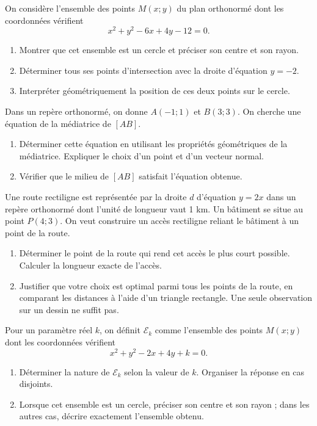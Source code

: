On considère l’ensemble des points $M(x;y)$ du plan orthonormé dont les coordonnées vérifient\[x^2+y^2-6x+4y-12=0.\]
\begin{enumerate}[label=\arabic*.]
\item Montrer que cet ensemble est un cercle et préciser son centre et son rayon.
\item Déterminer tous ses points d’intersection avec la droite d’équation $y=-2$.
\item Interpréter géométriquement la position de ces deux points sur le cercle.
\end{enumerate}
Dans un repère orthonormé, on donne $A(-1;1)$ et $B(3;3)$. On cherche une équation de la médiatrice de $[AB]$.
\begin{enumerate}[label=\arabic*.]
\item Déterminer cette équation en utilisant les propriétés géométriques de la médiatrice. Expliquer le choix d’un point et d’un vecteur normal.
\item Vérifier que le milieu de $[AB]$ satisfait l’équation obtenue.
\end{enumerate}
Une route rectiligne est représentée par la droite $d$ d’équation $y=2x$ dans un repère orthonormé dont l’unité de longueur vaut 1 km. Un bâtiment se situe au point $P(4;3)$. On veut construire un accès rectiligne reliant le bâtiment à un point de la route.
\begin{enumerate}[label=\arabic*.]
\item Déterminer le point de la route qui rend cet accès le plus court possible. Calculer la longueur exacte de l’accès.
\item Justifier que votre choix est optimal parmi tous les points de la route, en comparant les distances à l’aide d’un triangle rectangle. Une seule observation sur un dessin ne suffit pas.
\end{enumerate}
Pour un paramètre réel $k$, on définit $\mathcal E_k$ comme l’ensemble des points $M(x;y)$ dont les coordonnées vérifient\[x^2+y^2-2x+4y+k=0.\]
\begin{enumerate}[label=\arabic*.]
\item Déterminer la nature de $\mathcal E_k$ selon la valeur de $k$. Organiser la réponse en cas disjoints.
\item Lorsque cet ensemble est un cercle, préciser son centre et son rayon ; dans les autres cas, décrire exactement l’ensemble obtenu.
\end{enumerate}
